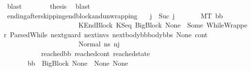 \begin{isabellebody}
\ blast\isanewline
\ \ \ \ \ \ \isamarkupfalse%
\ {\isacharquery}{\kern0pt}thesis\ \isamarkupfalse%
\ blast\isanewline
\ \ \ \ \isamarkupfalse%
\isanewline
\ \ \isamarkupfalse%
\isanewline
{}\isamarkupfalse%
%
\endisatagproof
{\isafoldproof}%
%
\isadelimproof
\isanewline
%
\endisadelimproof
\isanewline
{}\isamarkupfalse%
\ ending{\isacharunderscore}{\kern0pt}after{\isacharunderscore}{\kern0pt}skipping{\isacharunderscore}{\kern0pt}endblock{\isacharunderscore}{\kern0pt}and{\isacharunderscore}{\kern0pt}unwrapping{\isacharcolon}{\kern0pt}\isanewline
\ \ \ {\isachardoublequoteopen}j\ {\isacharequal}{\kern0pt}\ Suc\ j{\isacharprime}{\kern0pt}{\isachardoublequoteclose}\isanewline
\ \ \ \ \ \ \ {\isachardoublequoteopen}M{\isacharcomma}{\kern0pt}{\isasymLambda}{\isacharcomma}{\kern0pt}{\isasymGamma}{\isacharcomma}{\kern0pt}{\isasymOmega}{\isacharcomma}{\kern0pt}T\ {\isasymturnstile}{\isacharparenleft}{\kern0pt}bb{\isacharcomma}{\kern0pt}\isanewline
\ \ \ \ \ \ \ \ \ \ \ \ \ \ \ \ \ \ \ \ \ \ KEndBlock\ {\isacharparenleft}{\kern0pt}KSeq\ {\isacharparenleft}{\kern0pt}BigBlock\ None\ {\isacharbrackleft}{\kern0pt}{\isacharbrackright}{\kern0pt}\ {\isacharparenleft}{\kern0pt}Some\ {\isacharparenleft}{\kern0pt}WhileWrapper\ {\isacharparenleft}{\kern0pt}ParsedWhile\ next{\isacharunderscore}{\kern0pt}guard\ next{\isacharunderscore}{\kern0pt}invs\ {\isacharparenleft}{\kern0pt}next{\isacharunderscore}{\kern0pt}body{\isacharunderscore}{\kern0pt}bb{\isacharhash}{\kern0pt}body{\isacharunderscore}{\kern0pt}bbs{\isacharparenright}{\kern0pt}{\isacharparenright}{\kern0pt}{\isacharparenright}{\kern0pt}{\isacharparenright}{\kern0pt}\ None{\isacharparenright}{\kern0pt}\ cont{}{\isacharparenright}{\kern0pt}{\isacharcomma}{\kern0pt}\isanewline
\ \ \ \ \ \ \ \ \ \ \ \ \ \ \ \ \ \ \ \ \ \ Normal\ ns{}{\isacharprime}{\kern0pt}{\isacharprime}{\kern0pt}{\isacharparenright}{\kern0pt}\ {\isacharminus}{\kern0pt}n{\isasymlongrightarrow}{\isacharcircum}{\kern0pt}j{\isacharprime}{\kern0pt}\isanewline
\ \ \ \ \ \ \ \ \ \ \ {\isacharparenleft}{\kern0pt}reached{\isacharunderscore}{\kern0pt}bb{\isacharcomma}{\kern0pt}\ reached{\isacharunderscore}{\kern0pt}cont{\isacharcomma}{\kern0pt}\ reached{\isacharunderscore}{\kern0pt}state{\isacharparenright}{\kern0pt}{\isachardoublequoteclose}\isanewline
\ \ \ \ \ \ \ {\isachardoublequoteopen}bb\ {\isacharequal}{\kern0pt}\ BigBlock\ None\ {\isacharbrackleft}{\kern0pt}{\isacharbrackright}{\kern0pt}\ None\ None{\isachardoublequoteclose}\isanewline

\end{isabellebody}
